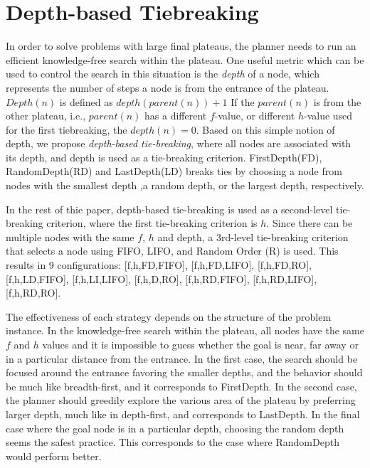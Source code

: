 \section{Depth-based Tiebreaking}

In order to solve problems with large final plateaus, the
planner needs to run an efficient knowledge-free search within the
plateau.  One useful metric which can be used to control the search in this
situation is the \emph{depth} of a node, which represents the number 
of steps a node is from the entrance of the plateau.
$Depth(n)$ is defined as $depth(parent(n)) + 1$
If the $parent(n)$ is from the other plateau, i.e., $parent(n)$ has a different $f$-value, or different $h$-value used for the first
tiebreaking, the $depth(n) = 0$. 
Based on this simple notion of depth,
we propose  \emph{depth-based tie-breaking}, where all nodes are associated with its depth, 
and depth is used as a tie-breaking criterion.
FirstDepth(FD), RandomDepth(RD) and LastDepth(LD) breaks ties by choosing a node from 
nodes with the smallest depth ,a random depth, or the largest depth, respectively.

In the rest of thie paper, depth-based tie-breaking is used as a second-level tie-breaking criterion,
where the first tie-breaking criterion is $h$.
Since there can be multiple nodes with the same $f$, $h$ and depth,
a 3rd-level tie-breaking criterion that selects a node using FIFO, LIFO, and Random Order (R) is used.
This results in 9 configurations:
[f,h,FD,FIFO], [f,h,FD,LIFO], [f,h,FD,RO], [f,h,LD,FIFO], [f,h,LI,LIFO], [f,h,D,RO], [f,h,RD,FIFO], [f,h,RD,LIFO], [f,h,RD,RO].


The effectiveness of each strategy depends on the structure of the problem instance.
In the knowledge-free search within the plateau, all nodes have the same
$f$ and $h$ values %
 and it is impossible to guess whether the goal is near, far
away or in a particular distance from the entrance. 
In the first case,
the search should be focused around the entrance favoring the smaller
depths, and the behavior should be much like breadth-first, and it
corresponds to FirstDepth. In the second case, the planner should
greedily explore the various area of the plateau by preferring larger
depth, much like in depth-first, and corresponds to LastDepth. In the
final case where the goal node is in a particular depth, choosing the
random depth seems the safest practice. This corresponds to the case
where RandomDepth would perform better.



